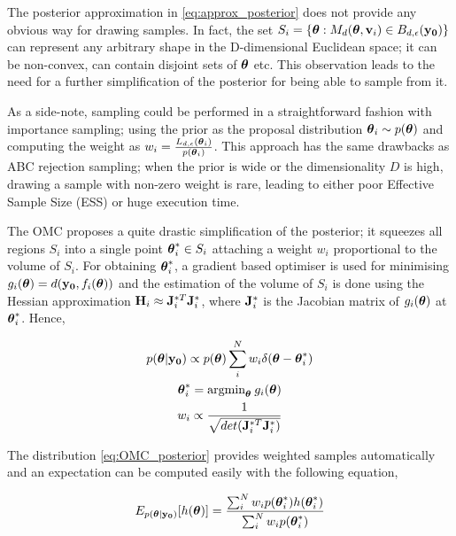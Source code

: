 The posterior approximation in \eqref{eq:approx_posterior} does not 
provide any obvious way for drawing samples. In fact, the set
$S_i = \{ \boldsymbol{\theta}: M_d(\boldsymbol{\theta}, \mathbf{v}_i) \in B_{d,\epsilon}(\mathbf{y_0}) \}$ can represent
any arbitrary shape in the D-dimensional Euclidean space; it can be
non-convex, can contain disjoint sets of $\boldsymbol{\theta}$ etc. This
observation leads to the need for a further simplification of the
posterior for being able to sample from it.

As a side-note, sampling could be performed in a straightforward
fashion with importance sampling; using the prior as the proposal
distribution $\boldsymbol{\theta}_i \sim p(\boldsymbol{\theta})$ and computing the weight as
$w_i = \frac{L_{d,\epsilon}(\boldsymbol{\theta}_i)}{p(\boldsymbol{\theta}_i)}$. This approach
has the same drawbacks as ABC rejection sampling; when the prior is
wide or the dimensionality $D$ is high, drawing a sample with non-zero
weight is rare, leading to either poor Effective Sample Size (ESS) or
huge execution time.

The OMC proposes a quite drastic simplification of the posterior; it
squeezes all regions $S_i$ into a single point $\boldsymbol{\theta}_i^* \in S_i$
attaching a weight $w_i$ proportional to the volume of $S_i$. For
obtaining $\boldsymbol{\theta}_i^*$, a gradient based optimiser is used for
minimising $g_i(\boldsymbol{\theta}) = d(\mathbf{y_0}, f_i(\boldsymbol{\theta}))$ and the estimation of the volume
of $S_i$ is done using the Hessian approximation $\mathbf{H}_i \approx \mathbf{J}_i^{*T}\mathbf{J}_i^*$, where $\mathbf{J}_i^*$ is the Jacobian matrix of $g_i(\boldsymbol{\theta})$ at $\boldsymbol{\theta}_i^*$. Hence,

\begin{gather} \label{eq:OMC_posterior}
    p(\boldsymbol{\theta}|\mathbf{y_0}) \propto p(\boldsymbol{\theta}) \sum_i^N w_i \delta(\boldsymbol{\theta} - \boldsymbol{\theta}_i^*)\\
  \boldsymbol{\theta}_i^* = \text{argmin}_{\boldsymbol{\theta}} \:g_i(\boldsymbol{\theta}) \\
  w_i \propto \frac{1}{\sqrt{det( \mathbf{J}_i^{*T}\mathbf{J}_i^*)}}
\end{gather}

The distribution \eqref{eq:OMC_posterior} provides weighted samples automatically and an expectation can be computed easily with the following equation,

\begin{equation}
  \label{eq:OMC_expectation}
  E_{p(\boldsymbol{\theta}|\mathbf{y_0})}[h(\boldsymbol{\theta})] = \frac{\sum_i^N w_i p(\boldsymbol{\theta}_i^*)h(\boldsymbol{\theta}_i^*)}{\sum_i^N w_i p(\boldsymbol{\theta}_i^*)}
\end{equation}
